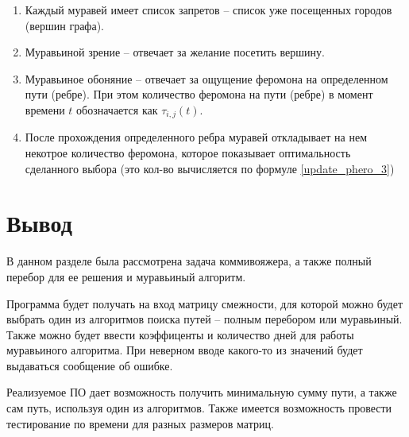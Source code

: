 \begin{enumerate}
	\item Каждый муравей имеет список запретов -- список уже посещенных городов (вершин графа).
	\item Муравьиной зрение -- отвечает за желание посетить вершину.
	\item Муравьиное обоняние -- отвечает за ощущение феромона на определенном пути (ребре). При этом количество феромона на пути (ребре) в момент времени $t$ обозначается как $\tau_{i, j} (t)$.
	\item После прохождения определенного ребра муравей откладывает на нем некотрое количество феромона, которое показывает оптимальность сделанного выбора (это кол-во вычисляется по формуле \eqref{update_phero_3})
\end{enumerate}



\section{Вывод}

В данном разделе была рассмотрена задача коммивояжера, а также полный перебор для ее решения и муравьиный алгоритм.

Программа будет получать на вход матрицу смежности, для которой можно будет выбрать один из алгоритмов поиска путей -- полным перебором или муравьиный. Также можно будет ввести коэффиценты и количество дней для работы муравьиного алгоритма. При неверном вводе какого-то из значений будет выдаваться сообщение об ошибке.

Реализуемое ПО дает возможность получить минимальную сумму пути, а также сам путь, используя один из алгоритмов. Также имеется возможность провести тестирование по времени для разных размеров матриц.
